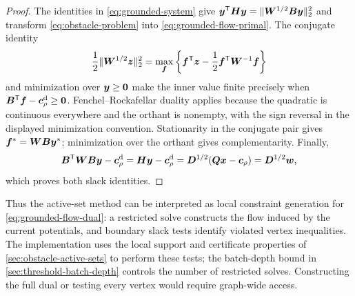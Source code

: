 \begin{proof}
The identities in \cref{eq:grounded-system} give
$\bm{y}^{\mathsf{T}}\bm{H}\bm{y}=\lVert\bm{W}^{1/2}\bm{B}\bm{y}\rVert_2^2$ and transform
\cref{eq:obstacle-problem} into \cref{eq:grounded-flow-primal}.  The conjugate
identity
\[
 \frac12\lVert\bm{W}^{1/2}\bm{z}\rVert_2^2
 =\max_{\bm{f}}
 \left\{\bm{f}^{\mathsf{T}}\bm{z}-\frac12\bm{f}^{\mathsf{T}}\bm{W}^{-1}\bm{f}\right\}
\]
and minimization over $\bm{y}\geq\bm{0}$ make the inner value finite precisely
when $\bm{B}^{\mathsf{T}}\bm{f}-\bm{c}_\rho^{\mathrm d}\geq\bm{0}$.  Fenchel--Rockafellar duality applies
because the quadratic is continuous everywhere and the orthant is nonempty,
with the sign reversal in the displayed minimization convention.  Stationarity in the conjugate pair
gives $\bm{f}^*=\bm{W}\bm{B}\bm{y}^*$; minimization over the orthant gives
complementarity.  Finally,
\[
 \bm{B}^{\mathsf{T}}\bm{W}\bm{B}\bm{y}-\bm{c}_\rho^{\mathrm d}
 =\bm{H}\bm{y}-\bm{c}_\rho^{\mathrm d}
 =\bm{D}^{1/2}(\bm{Q}\bm{x}-\bm{c}_\rho)
 =\bm{D}^{1/2}\bm{w},
\]
which proves both slack identities.
\end{proof}

Thus the active-set method can be interpreted as local constraint
generation for \cref{eq:grounded-flow-dual}: a restricted solve constructs
the flow induced by the current potentials, and boundary slack tests identify
violated vertex inequalities. The implementation uses the local support
and certificate properties of \cref{sec:obstacle-active-sets} to perform
these tests; the batch-depth bound in \cref{sec:threshold-batch-depth}
controls the number of restricted solves. Constructing the full dual or
testing every vertex would require graph-wide access.
